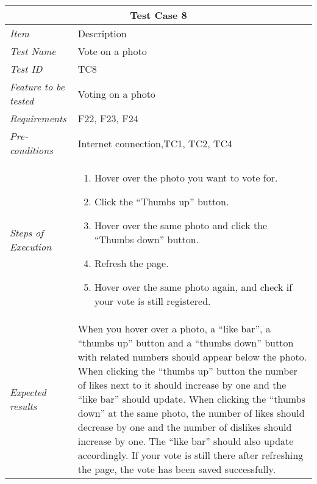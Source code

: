 %
\begin{minipage}{\linewidth}
\setlength{\tabcolsep}{15pt}
\centering
{}
\begin{tabular}{ |l|p{70mm}| }
	\hline
	\multicolumn{2}{|c|}{\cellcolor{gray!25} \textbf{Test Case 8}} \\
	\hline
	\it{\cellcolor{gray!25}Item} & {\cellcolor{gray!25} Description } \\
	\hline
	\it{\cellcolor{gray!25}Test Name } & Vote on a photo \\ \hline
	\it{\cellcolor{gray!25}Test ID} & TC8 \\ \hline
	\it{\cellcolor{gray!25}Feature to be tested} & Voting on a photo \\ \hline
	\it{\cellcolor{gray!25}Requirements} & F22, F23, F24  \\ \hline
	\it{\cellcolor{gray!25}Pre-conditions} & Internet connection,TC1, TC2, TC4  \\ \hline
	\it{\cellcolor{gray!25}Steps of Execution} & \begin{enumerate}
	                                       \item Hover over the photo you want to vote for.
	                                       \item Click the “Thumbs up” button.
	                                       \item Hover over the same photo and click the “Thumbs down” button.
	                                       \item Refresh the page.
	                                       \item Hover over the same photo again, and check if your vote is still registered.
	                                     \end{enumerate} \\ \hline
	\it{\cellcolor{gray!25}Expected results} & When you hover over a photo, a “like bar”, a “thumbs up” button and a “thumbs down” button with related numbers should appear below the photo. When clicking the “thumbs up” button the number of likes next to it should increase by one and the “like bar” should update. When clicking the “thumbs down” at the same photo, the number of likes should decrease by one and the number of dislikes should increase by one. The “like bar” should also update accordingly. If your vote is still there after refreshing the page, the vote has been saved successfully. \\
	\hline
\end{tabular}
\medskip
\end{minipage}
